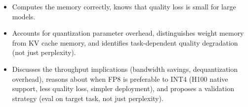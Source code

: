 \begin{interviewq}

\goodgreat
\begin{itemize}
    \item {} Computes the memory correctly, knows that quality loss is small for large models.
    \item {} Accounts for quantization parameter overhead, distinguishes weight memory from KV cache memory, and identifies task-dependent quality degradation (not just perplexity).
    \item {} Discusses the throughput implications (bandwidth savings, dequantization overhead), reasons about when FP8 is preferable to INT4 (H100 native support, less quality loss, simpler deployment), and proposes a validation strategy (eval on target task, not just perplexity).
\end{itemize}

\end{interviewq}


